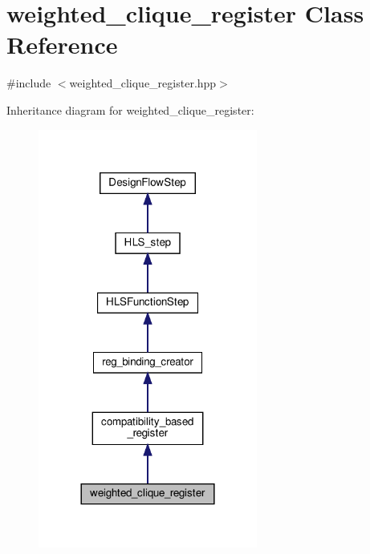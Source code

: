 \hypertarget{classweighted__clique__register}{}\section{weighted\+\_\+clique\+\_\+register Class Reference}
\label{classweighted__clique__register}


{\ttfamily \#include $<$weighted\+\_\+clique\+\_\+register.\+hpp$>$}



Inheritance diagram for weighted\+\_\+clique\+\_\+register\+:
\nopagebreak
\begin{figure}[H]
\begin{center}
\leavevmode
\includegraphics[width=204pt]{d7/dc4/classweighted__clique__register__inherit__graph}
\end{center}
\end{figure}



